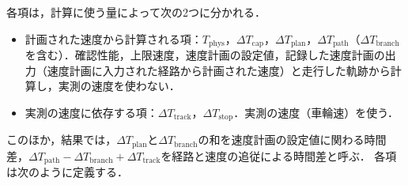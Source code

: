 各項は，計算に使う量によって次の2つに分かれる．
\begin{itemize}[leftmargin=2\zw]
  \item 計画された速度から計算される項：$T_{\mathrm{phys}}$，$\Delta T_{\mathrm{cap}}$，$\Delta T_{\mathrm{plan}}$，$\Delta T_{\mathrm{path}}$（$\Delta T_{\mathrm{branch}}$を含む）．確認性能，上限速度，速度計画の設定値，記録した速度計画の出力（速度計画に入力された経路から計画された速度）と走行した軌跡から計算し，実測の速度を使わない．
  \item 実測の速度に依存する項：$\Delta T_{\mathrm{track}}$，$\Delta T_{\mathrm{stop}}$．実測の速度（車輪速）を使う．
\end{itemize}
このほか，結果では，$\Delta T_{\mathrm{plan}}$と$\Delta T_{\mathrm{branch}}$の和を速度計画の設定値に関わる時間差，$\Delta T_{\mathrm{path}}-\Delta T_{\mathrm{branch}}+\Delta T_{\mathrm{track}}$を経路と速度の追従による時間差と呼ぶ．
各項は次のように定義する．
